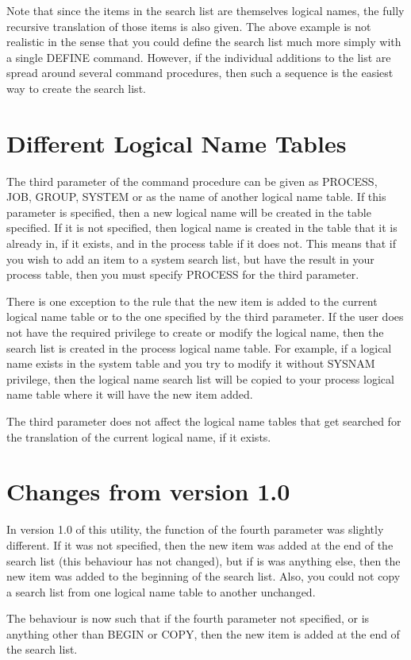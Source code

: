 Note that since the items in the search list are themselves logical names, the
fully recursive translation of those items is also given. The above example is
not realistic in the sense that you could define the search list much more
simply with a single DEFINE command. However, if the individual additions to
the list are spread around several command procedures, then such a sequence is
the easiest way to create the search list.

\section{Different Logical Name Tables}

The third parameter of the command procedure can be given as PROCESS, JOB,
GROUP, SYSTEM or as the name of another logical name table. If this parameter
is specified, then a new logical name will be created in the table specified.
If it is not specified, then logical name is created in the table that it is
already in, if it exists, and in the process table if it does not. This means
that if you wish to add an item to a system search list, but have the result
in your process table, then you must specify PROCESS for the third parameter.

There is one exception to the rule that the new item is added to the current
logical name table or to the one specified by the third parameter. If the user
does not have the required privilege to create or modify the logical name, then
the search list is created in the process logical name table. For example, if a
logical name exists in the system table and you try to modify it without SYSNAM
privilege, then the logical name search list will be copied to your process
logical name table where it will have the new item added.

The third parameter does not affect the logical name tables that get searched
for the translation of the current logical name, if it exists.

\section{Changes from version 1.0}

In version 1.0 of this utility, the function of the fourth parameter was
slightly different. If it was not specified, then the new item was added at the
end of the search list (this behaviour has not changed), but if is was anything
else, then the new item was added to the beginning of the search list. Also,
you could not copy a search list from one logical name table to another
unchanged.

The behaviour is now such that if the fourth parameter not specified, or is
anything other than BEGIN or COPY, then the new item is added at the end of the
search list.


